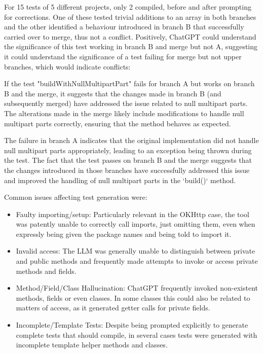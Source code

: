 For 15 tests of 5 different projects, only 2 compiled, before and after prompting for corrections. One of these tested trivial additions to an array in both branches and the other identified a behaviour introduced in branch B that successfully carried over to merge, thus not a conflict. Positively, ChatGPT could understand the significance of this test working in branch B and merge but not A, suggesting it could understand the significance of a test failing for merge but not upper branches, which would indicate conflicts:

\begin{response}
If the test "buildWithNullMultipartPart" fails for branch A but works on branch B and the merge, it suggests that the changes made in branch B (and subsequently merged) have addressed the issue related to null multipart parts. The alterations made in the merge likely include modifications to handle null multipart parts correctly, ensuring that the method behaves as expected.

The failure in branch A indicates that the original implementation did not handle null multipart parts appropriately, leading to an exception being thrown during the test. The fact that the test passes on branch B and the merge suggests that the changes introduced in those branches have successfully addressed this issue and improved the handling of null multipart parts in the `build()` method.
\end{response}

Common issues affecting test generation were:

\begin{itemize}
  \item Faulty importing/setup: Particularly relevant in the OKHttp case, the tool was patently unable to correctly call imports, just omitting them, even when expressly being given the package names and being told to import it.
  \item Invalid access: The LLM was generally unable to distinguish between private and public methods and frequently made attempts to invoke or access private methods and fields.
  \item Method/Field/Class Hallucination: ChatGPT frequently invoked non-existent methods, fields or even classes. In some classes this could also be related to matters of access, as it generated getter calls for private fields.
  \item Incomplete/Template Tests: Despite being prompted explicitly to generate complete tests that should compile, in several cases tests were generated with incomplete template helper methods and classes.
\end{itemize}

